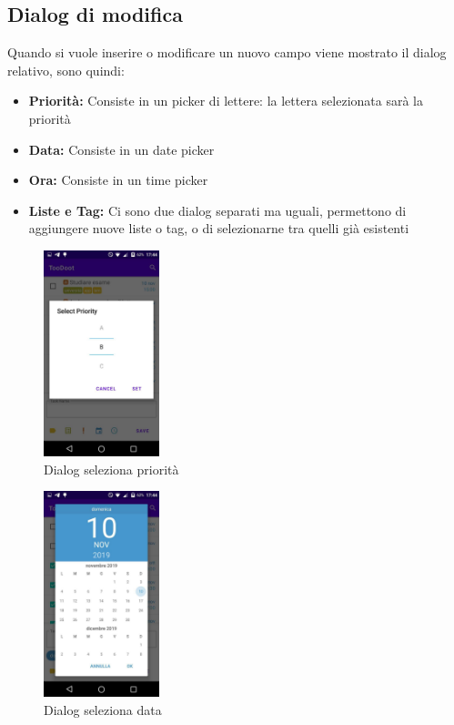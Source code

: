 \documentclass[]{article}
\providecommand{\tightlist}{%
  \setlength{\itemsep}{0pt}\setlength{\parskip}{0pt}}
\begin{document}
\hypertarget{dialog-di-modifica}{%
\subsection{Dialog di modifica}\label{dialog-di-modifica}}

Quando si vuole inserire o modificare un nuovo campo viene mostrato il
dialog relativo, sono quindi:

\begin{itemize}
\tightlist
\item
  \textbf{Priorità:} Consiste in un picker di lettere: la lettera
  selezionata sarà la priorità
\item
  \textbf{Data:} Consiste in un date picker
\item
  \textbf{Ora:} Consiste in un time picker
\item
  \textbf{Liste e Tag:} Ci sono due dialog separati ma uguali,
  permettono di aggiungere nuove liste o tag, o di selezionarne tra
  quelli già esistenti
\end{itemize}

\begin{figure}
\centering
\includegraphics[width=0.3\textwidth,height=0.1\textheight]{./img/dialog_priority.jpg}
\caption{Dialog seleziona priorità}
\end{figure}

\begin{figure}
\centering
\includegraphics[width=0.3\textwidth,height=0.1\textheight]{./img/dialog_data.jpg}
\caption{Dialog seleziona data}
\end{figure}
\end{document}
